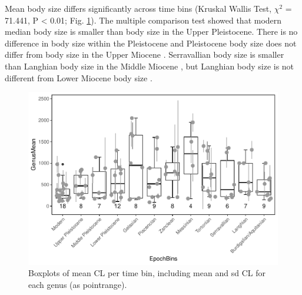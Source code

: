 \FloatBarrier




Mean body size differs significantly across time bins (Kruskal Wallis Test, $\chi^2$ = 71.441, P < 0.01; Fig. \ref{fig:boxBins}). 
The multiple comparison test showed that modern median body size is smaller than body size in the Upper Pleistocene. %
There is no difference in body size within the Pleistocene %
and Pleistocene body size does not differ from body size in the Upper Miocene%
. Serravallian body size is smaller than Langhian body size in the Middle Miocene%
, but Langhian body size is not different from Lower Miocene body size%
.


\begin{figure}[hbtp]
	\centering
	\includegraphics{MA_JJ_files/figure-latex/BPGBins-1.pdf}
	\caption{Boxplots of mean CL per time bin, including mean and sd CL for
		each genus (as pointrange).}
	\label{fig:boxBins}
\end{figure}




